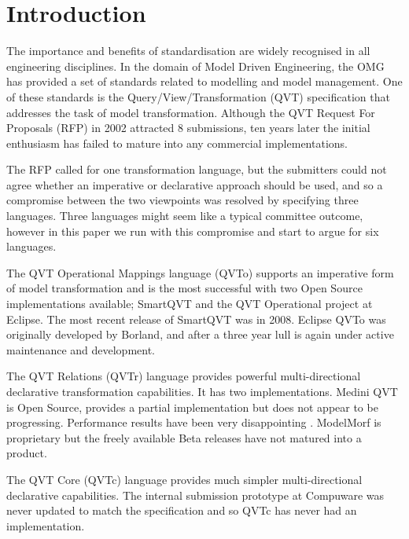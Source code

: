 %
\section{Introduction}
The importance and benefits of standardisation are widely recognised in all engineering disciplines. In the domain of Model Driven Engineering, the OMG has provided a set of standards related to modelling and model management. One of these standards is the Query/View/Transformation (QVT) specification\cite{QVT1.1} that addresses the task of model transformation. Although the QVT Request For Proposals (RFP)\cite{QVT-RFP}  in 2002 attracted 8 submissions, ten years later the initial enthusiasm has failed to mature into any commercial implementations.

The RFP called for one transformation language, but the submitters could not agree whether an  imperative or declarative approach should be used, and so a compromise between the two viewpoints was resolved by specifying three languages. Three languages might seem like a typical committee outcome, however in this paper we run with this compromise and start to argue for six languages.

The QVT Operational Mappings language (QVTo) supports an imperative form of model transformation and is the most successful with two Open Source implementations available; SmartQVT and the QVT Operational project at Eclipse. The most recent release of SmartQVT was in 2008. Eclipse QVTo was originally developed by Borland, and after a three year lull is again under active maintenance and development.

The QVT Relations (QVTr) language provides powerful multi-directional declarative transformation capabilities. It has two implementations. Medini QVT is Open Source, provides a partial implementation but does not appear to be progressing. Performance results have been very disappointing \cite{Bosems2011}. ModelMorf is proprietary but the freely available Beta releases have not matured into a product.

The QVT Core (QVTc) language provides much simpler multi-directional declarative capabilities. The internal submission prototype at Compuware was never updated to match the specification and so QVTc has never had an implementation.

